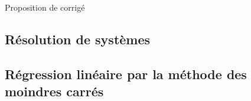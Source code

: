 
\vspace{0.1cm}
\begin{huge}
 Proposition de corrigé
\end{huge}

\subsection{Résolution de systèmes}
\setcounter{thequestion}{0}
\subsection{Régression linéaire par la méthode des moindres carrés}
\setcounter{thequestion}{0}
